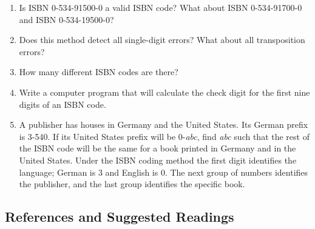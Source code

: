 {\begin{enumerate}
\begin{enumerate}
 \item
Is ISBN 0-534-91500-0 a valid ISBN code?  What about ISBN 0-534-91700-0 and ISBN 0-534-19500-0? 
 
 \item
Does this method detect all single-digit errors?  What about all transposition errors? 
 
 \item
How many different ISBN codes are there?
 
 \item
Write a computer program that will calculate the check digit for the first nine digits of an ISBN code. 
 
 \item
A publisher has houses in Germany and the United States.  Its German prefix is 3-540.  If its United States prefix will be 0-{\it abc}, find {\it abc} such that the rest of the ISBN code will be the same for a book printed in Germany and in the United States. Under the ISBN coding method the first digit identifies the language; German is  3 and English is  0.  The next group of numbers identifies the publisher, and the last group identifies the specific book. 
 
\end{enumerate}
 
\end{enumerate}
}
 
 
 
\subsection*{References and Suggested Readings} %
 
